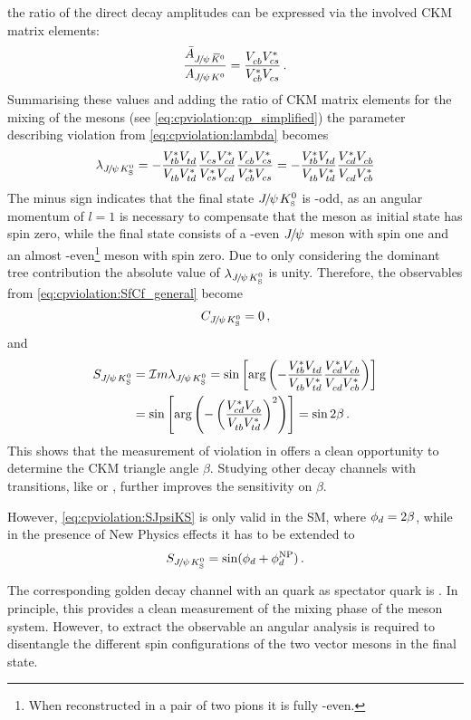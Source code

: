 the ratio of the direct decay amplitudes can be expressed via the involved CKM
matrix elements:
\begin{align}
	\frac{\bar{A}_{{{J\mskip -3mu/\mskip -2mu\psi\mskip 2mu}}{{\kern 0.2em\overline{\kern -0.2em K}{}}{}^0}}}{A_{{{J\mskip -3mu/\mskip -2mu\psi\mskip 2mu}}{{K}^0}}} = \frac{{V_{{c}{b}}^{}}{V_{{c}{s}}^\ast}}{{V_{{c}{b}}^\ast}{V_{{c}{s}}^{}}}\,.
\end{align}
Summarising these values and adding the ratio of CKM matrix elements for the
mixing of the \Bd mesons (see \cref{eq:cpviolation:qp_simplified}) the
parameter describing \CP violation from \cref{eq:cpviolation:lambda} becomes
\begin{align}
	\lambda_{{{J\mskip -3mu/\mskip -2mu\psi\mskip 2mu}}{{K}^0_{\mathrm{ \scriptscriptstyle S}}}} = - \frac{{V_{{t}{b}}^\ast}{V_{{t}{d}}^{}}}{{V_{{t}{b}}^{}}{V_{{t}{d}}^\ast}}\frac{{V_{{c}{s}}^{}}{V_{{c}{d}}^\ast}}{{V_{{c}{s}}^\ast}{V_{{c}{d}}^{}}}\frac{{V_{{c}{b}}^{}}{V_{{c}{s}}^\ast}}{{V_{{c}{b}}^\ast}{V_{{c}{s}}^{}}} = - \frac{{V_{{t}{b}}^\ast}{V_{{t}{d}}^{}}}{{V_{{t}{b}}^{}}{V_{{t}{d}}^\ast}}\frac{{V_{{c}{d}}^\ast}{V_{{c}{b}}^{}}}{{V_{{c}{d}}^{}}{V_{{c}{b}}^\ast}}
\label{eq:lambda_JPsiKS}
\end{align}
The minus sign indicates that the final state ${{J\mskip -3mu/\mskip -2mu\psi\mskip 2mu}}{{K}^0_{\mathrm{ \scriptscriptstyle S}}}$ is \CP-odd, as an
angular momentum of $l = 1$ is necessary to compensate that the \Bd meson as
initial state has spin zero, while the final state consists of a \CP-even
${{J\mskip -3mu/\mskip -2mu\psi\mskip 2mu}}$ meson with spin one and an almost \CP-even\footnote{When reconstructed
in a pair of two pions it is fully \CP-even.} \KS meson with spin zero. Due to
only considering the dominant tree contribution the absolute value of
$\lambda_{{{J\mskip -3mu/\mskip -2mu\psi\mskip 2mu}}{{K}^0_{\mathrm{ \scriptscriptstyle S}}}}$ is unity. Therefore, the \CP observables from
\cref{eq:cpviolation:SfCf_general} become
\begin{align}
	C_{{{J\mskip -3mu/\mskip -2mu\psi\mskip 2mu}}{{K}^0_{\mathrm{ \scriptscriptstyle S}}}} = 0\,,
\end{align}
and
\begin{align}
\begin{split}
	S_{{{J\mskip -3mu/\mskip -2mu\psi\mskip 2mu}}{{K}^0_{\mathrm{ \scriptscriptstyle S}}}} &= \mathcal{I}m\lambda_{{{J\mskip -3mu/\mskip -2mu\psi\mskip 2mu}}{{K}^0_{\mathrm{ \scriptscriptstyle S}}}}
			 = \sin\left[\text{arg}\left(-\frac{{V_{{t}{b}}^\ast}{V_{{t}{d}}^{}}}{{V_{{t}{b}}^{}}{V_{{t}{d}}^\ast}}\frac{{V_{{c}{d}}^\ast}{V_{{c}{b}}^{}}}{{V_{{c}{d}}^{}}{V_{{c}{b}}^\ast}}\right)\right]\\
			 &= \sin\left[\text{arg}\left(-\left(\frac{{V_{{c}{d}}^\ast}{V_{{c}{b}}^{}}}{{V_{{t}{b}}^{}}{V_{{t}{d}}^\ast}}\right)^2\right)\right]
			 = \sin 2\beta\,.
\end{split}
\label{eq:cpviolation:SJpsiKS}
\end{align}
This shows that the measurement of \CP violation in \BdToJPsiKS offers a clean
opportunity to determine the CKM triangle angle $\beta$. Studying other decay
channels with \bToccbars transitions, like \BdToJPsiKL or \BdToPsiTwoSKS,
further improves the sensitivity on $\beta$.

However, \cref{eq:cpviolation:SJpsiKS} is only valid in the SM, where ${\phi_{{d}}} =
2\beta$, while in the presence of New Physics effects it has to be extended to
\begin{align}
	S_{{{J\mskip -3mu/\mskip -2mu\psi\mskip 2mu}}{{K}^0_{\mathrm{ \scriptscriptstyle S}}}} = \sin({\phi_{{d}}} + \phi_d^{\mathrm{NP}})\,.
\label{eq:cpviolation:new_physics_phase}
\end{align}

The corresponding golden decay channel with an \squark quark as spectator
quark is \myBsToJPsiPhi. In principle, this provides a clean measurement of
the mixing phase \phis of the \Bs meson system. However, to extract the \CP
observable an angular analysis is required to disentangle the
different spin configurations of the two vector mesons in the final state.
